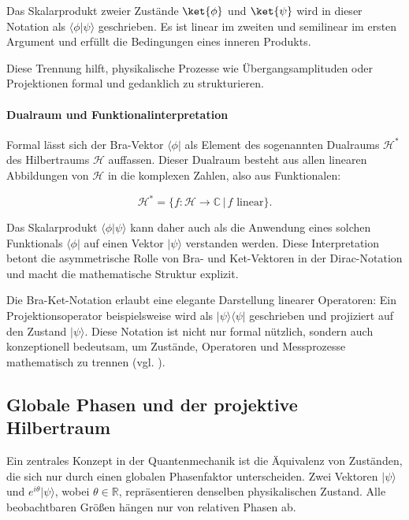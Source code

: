 Das Skalarprodukt zweier Zustände $\ket{\phi}$ und $\ket{\psi}$ wird in dieser Notation als $\langle \phi | \psi \rangle$ geschrieben. Es ist linear im zweiten und semilinear im ersten Argument und erfüllt die Bedingungen eines inneren Produkts.



Diese Trennung hilft, physikalische Prozesse wie Übergangsamplituden oder Projektionen formal und gedanklich zu strukturieren.

\paragraph{Dualraum und Funktionalinterpretation}

Formal lässt sich der Bra-Vektor $\langle \phi|$ als Element des sogenannten Dualraums $\mathcal{H}^*$ des Hilbertraums $\mathcal{H}$ auffassen. Dieser Dualraum besteht aus allen linearen Abbildungen von $\mathcal{H}$ in die komplexen Zahlen, also aus Funktionalen:

\[
\mathcal{H}^* = \{ f : \mathcal{H} \to \mathbb{C} \,|\, f \text{ linear} \}.
\]

Das Skalarprodukt $\langle \phi | \psi \rangle$ kann daher auch als die Anwendung eines solchen Funktionals $\langle \phi|$ auf einen Vektor $|\psi\rangle$ verstanden werden. Diese Interpretation betont die asymmetrische Rolle von Bra- und Ket-Vektoren in der Dirac-Notation und macht die mathematische Struktur explizit.

Die Bra-Ket-Notation erlaubt eine elegante Darstellung linearer Operatoren: Ein Projektionsoperator beispielsweise wird als $|\psi\rangle\langle\psi|$ geschrieben und projiziert auf den Zustand $|\psi\rangle$. Diese Notation ist nicht nur formal nützlich, sondern auch konzeptionell bedeutsam, um Zustände, Operatoren und Messprozesse mathematisch zu trennen (vgl. \cite[Kap.~3.2]{nolting_springer_2013}).

\subsection{Globale Phasen und der projektive Hilbertraum}
\label{subsec:Globale Phasen und der projektive Hilbertraum }

Ein zentrales Konzept in der Quantenmechanik ist die Äquivalenz von Zuständen, die sich nur durch einen globalen Phasenfaktor unterscheiden. Zwei Vektoren $|\psi\rangle$ und $e^{i\theta} |\psi\rangle$, wobei $\theta \in \mathbb{R}$, repräsentieren denselben physikalischen Zustand. Alle beobachtbaren Größen hängen nur von relativen Phasen ab.

